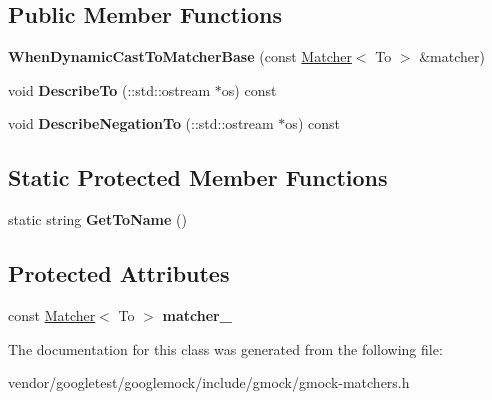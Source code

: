 \subsection*{Public Member Functions}
\begin{DoxyCompactItemize}
\item 
{\bfseries When\+Dynamic\+Cast\+To\+Matcher\+Base} (const \hyperlink{classtesting_1_1Matcher}{Matcher}$<$ To $>$ \&matcher)\hypertarget{classtesting_1_1internal_1_1WhenDynamicCastToMatcherBase_a7da2a4c7c43d5e18db0a3233a601c8ab}{}\label{classtesting_1_1internal_1_1WhenDynamicCastToMatcherBase_a7da2a4c7c43d5e18db0a3233a601c8ab}

\item 
void {\bfseries Describe\+To} (\+::std\+::ostream $\ast$os) const \hypertarget{classtesting_1_1internal_1_1WhenDynamicCastToMatcherBase_ac5726cb7b40862aabecce4d4d9c6f8b1}{}\label{classtesting_1_1internal_1_1WhenDynamicCastToMatcherBase_ac5726cb7b40862aabecce4d4d9c6f8b1}

\item 
void {\bfseries Describe\+Negation\+To} (\+::std\+::ostream $\ast$os) const \hypertarget{classtesting_1_1internal_1_1WhenDynamicCastToMatcherBase_ac4f1370bc2db15a7242f06ea2e6309c2}{}\label{classtesting_1_1internal_1_1WhenDynamicCastToMatcherBase_ac4f1370bc2db15a7242f06ea2e6309c2}

\end{DoxyCompactItemize}
\subsection*{Static Protected Member Functions}
\begin{DoxyCompactItemize}
\item 
static string {\bfseries Get\+To\+Name} ()\hypertarget{classtesting_1_1internal_1_1WhenDynamicCastToMatcherBase_a5950142a073ce7a1931848a958c88962}{}\label{classtesting_1_1internal_1_1WhenDynamicCastToMatcherBase_a5950142a073ce7a1931848a958c88962}

\end{DoxyCompactItemize}
\subsection*{Protected Attributes}
\begin{DoxyCompactItemize}
\item 
const \hyperlink{classtesting_1_1Matcher}{Matcher}$<$ To $>$ {\bfseries matcher\+\_\+}\hypertarget{classtesting_1_1internal_1_1WhenDynamicCastToMatcherBase_a40d697407c960bee8fe3b125f5ac8730}{}\label{classtesting_1_1internal_1_1WhenDynamicCastToMatcherBase_a40d697407c960bee8fe3b125f5ac8730}

\end{DoxyCompactItemize}


The documentation for this class was generated from the following file\+:\begin{DoxyCompactItemize}
\item 
vendor/googletest/googlemock/include/gmock/gmock-\/matchers.\+h\end{DoxyCompactItemize}
